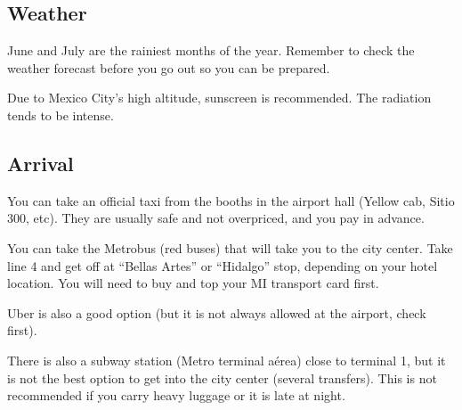 \subsection*{Weather}

June and July are the rainiest months of the year. Remember to check the weather forecast before you go out so you can be prepared.

Due to Mexico City's high altitude, sunscreen is recommended. The radiation tends to be intense.

\subsection*{Arrival}

You can take an official taxi from the booths in the airport hall (Yellow cab, Sitio 300, etc). They are usually safe and not overpriced, and you pay in advance.

You can take the Metrobus (red buses) that will take you to the city center. Take line 4 and get off at ``Bellas Artes'' or ``Hidalgo'' stop, depending on your hotel location. You will need to buy and top your MI transport card first.

Uber is also a good option (but it is not always allowed at the airport, check first).

There is also a subway station (Metro terminal a\'erea) close to terminal 1, but it is not the best option to get into the city center (several transfers). This is not recommended if you carry heavy luggage or it is late at night.



